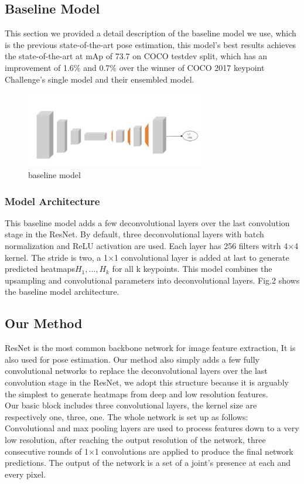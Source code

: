\documentclass[final]{cvpr}
\begin{document}
\subsection{Baseline Model}
This section we provided a detail description of the baseline model we use, which is the previous state-of-the-art pose estimation, this model's best results achieves the state-of-the-art at mAp of 73.7 on COCO testdev split, which has an improvement of 1.6\% and 0.7\% over the winner of COCO 2017 keypoint Challenge's single model and their ensembled model.\\
\begin{figure}[h]
\centering
\includegraphics[width=0.7\textwidth]{Resnet.jpg}
\caption{baseline model}
\end{figure}
\subsubsection{Model Architecture}
This baseline model adds a few deconvolutional layers over the last convolution stage in the ResNet. By default, three deconvolutional layers with batch normalization and ReLU activation are used. Each layer has 256 filters witrh 4$\times$4 kernel. The stride is two, a 1$\times$1 convolutional layer is added at last to generate predicted heatmaps${H_1,\ldots,H_k}$ for all k keypoints. This model combines the upsampling and convolutional parameters into deconvolutional layers. Fig.2 shows the baseline model architecture.
\subsection{Our Method}
ResNet is the most common backbone network for image feature extraction, It is also used for pose estimation. Our method also simply adds a few fully convolutional networks to replace the deconvolutional layers over the last convolution stage in the ResNet, we adopt this structure because it is arguably the simplest to generate heatmaps from deep and low resolution features. \\
\indent Our basic block includes three  convolutional layers, the kernel size are respectively one, three, one. The whole network is set up as follows: Convolutional and max pooling layers are used to process features down to a very low resolution, after reaching the output resolution of the network, three consecutive rounds of 1$\times$1 convolutions are applied to produce the final network predictions. The output of the network is a set of a joint's presence at each and every pixel.
\end{document}
